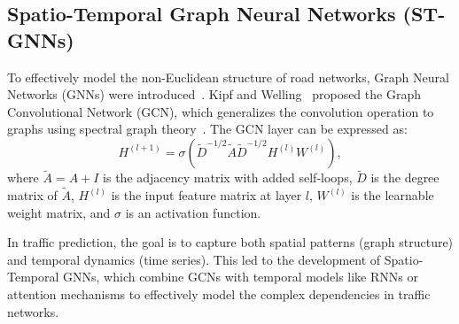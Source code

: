 \documentclass[11pt, a4paper]{article}
\begin{document}
\subsection{Spatio-Temporal Graph Neural Networks (ST-GNNs)}
To effectively model the non-Euclidean structure of road networks, Graph Neural Networks (GNNs) were introduced~\cite{scarselli2008graph}. Kipf and Welling~\cite{kipf2016semi} proposed the Graph Convolutional Network (GCN), which generalizes the convolution operation to graphs using spectral graph theory~\cite{defferrard2016convolutional}. The GCN layer can be expressed as:
\begin{equation}
  H^{(l+1)} = \sigma\left(\tilde{D}^{-1/2} \tilde{A} \tilde{D}^{-1/2} H^{(l)} W^{(l)}\right),
\end{equation}
where \(\tilde{A} = A + I\) is the adjacency matrix with added self-loops, \(\tilde{D}\) is the degree matrix of \(\tilde{A}\), \(H^{(l)}\) is the input feature matrix at layer \(l\), \(W^{(l)}\) is the learnable weight matrix, and \(\sigma\) is an activation function.

In traffic prediction, the goal is to capture both spatial patterns (graph structure) and temporal dynamics (time series). This led to the development of Spatio-Temporal GNNs, which combine GCNs with temporal models like RNNs or attention mechanisms to effectively model the complex dependencies in traffic networks.
\end{document}

